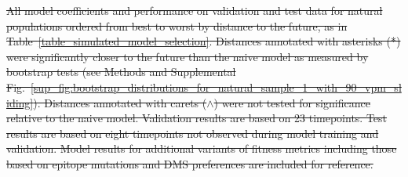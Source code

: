 \documentclass[9pt,lineno]{elife} %
\providecommand{\DIFdel}[1]{{\protect\color{red}\sout{#1}}}                      %
\providecommand{\DIFdelFL}[1]{\DIFdel{#1}} %
\providecommand{\DIFdeltex}[1]{{\protect\color{red}\sout{#1}}}                      %
\providecommand{\DIFdelFL}[1]{\DIFdel{#1}} %
\providecommand{\DIFdel}[1]{\texorpdfstring{\DIFdeltex{#1}}{}} %
\begin{document}


{%
\DIFdelFL{All model coefficients and performance on validation and test data for natural populations ordered from best to worst by distance to the future, as in Table~\ref{table_simulated_model_selection}.
      Distances annotated with asterisks (*) were significantly closer to the future than the naive model as measured by bootstrap tests (see Methods and Supplemental Fig.~\ref{sup_fig:bootstrap_distributions_for_natural_sample_1_with_90_vpm_sliding}).
      Distances annotated with carets ($\wedge$) were not tested for significance relative to the naive model.
      Validation results are based on 23 timepoints.
      Test results are based on eight timepoints not observed during model training and validation.
      Model results for additional variants of fitness metrics including those based on epitope mutations and DMS preferences are included for reference.
    }}
\end{document}
